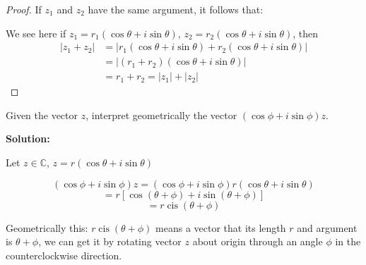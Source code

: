 \documentclass[
	12pt, %
	fleqn, %
	a4paper, %
]{LegrandOrangeBook}
\begin{document}
\begin{proof}
    If \( z_1 \) and \( z_2 \) have the same argument, it follows that:

    We see here if $z_1 = r_1(\cos \theta + i \sin \theta)$, $z_2 = r_2(\cos \theta + i \sin \theta)$, then
\begin{align*}
|z_1 + z_2| &= |r_1(\cos \theta + i \sin \theta) + r_2(\cos \theta + i \sin \theta)| \\
&= |(r_1 + r_2)(\cos \theta + i \sin \theta)| \\
&= r_1 + r_2 = |z_1| + |z_2|
\end{align*}
\end{proof}
\begin{exercise}
    Given the vector \( z \), interpret geometrically the vector \( (\cos \phi + i \sin \phi)z \).
\end{exercise}
\textbf{Solution:}

Let \( z \in \mathbb{C} \), \( z = r(\cos \theta + i \sin \theta) \)

\[
(\cos \phi + i \sin \phi)z = (\cos \phi + i \sin \phi)r(\cos \theta + i \sin \theta)
\]
\[
= r[\cos(\theta + \phi) + i \sin(\theta + \phi)]
\]
\[
= r\operatorname{cis}(\theta + \phi)
\]

Geometrically this: \( r\operatorname{cis}(\theta + \phi) \) means a vector that its length \( r \) and argument is \( \theta + \phi \), we can get it by rotating vector \( z \) about origin through an angle \( \phi \) in the counterclockwise direction.
\end{document}

